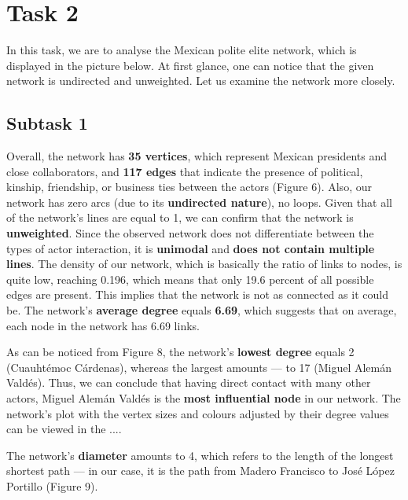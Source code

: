 \section{Task 2}
In this task, we are to analyse the Mexican polite elite network, which is displayed in the picture below. At first glance, one can notice that the given network is undirected and unweighted. Let us examine the network more closely.



\subsection{Subtask 1}
Overall, the network has \textbf{35 vertices}, which represent Mexican presidents and close collaborators, and \textbf{117 edges} that indicate the presence of political, kinship, friendship, or business ties between the actors (Figure 6). Also, our network has zero arcs (due to its \textbf{undirected nature}), no loops. Given that all of the network’s lines are equal to 1, we can confirm that the network is \textbf{unweighted}. Since the observed network does not differentiate between the types of actor interaction, it is \textbf{unimodal} and \textbf{does not contain multiple lines}. The density of our network, which is basically the ratio of links to nodes, is quite low, reaching 0.196, which means that only 19.6 percent of all possible edges are present. This implies that the network is not as connected as it could be. The network’s \textbf{average degree} equals \textbf{6.69}, which suggests that on average, each node in the network has 6.69 links.

\FloatBarrier


As can be noticed from Figure 8, the network’s \textbf{lowest degree} equals 2 (Cuauhtémoc Cárdenas), whereas the largest amounts — to 17 (Miguel Alemán Valdés). Thus, we can conclude that having direct contact with many other actors, Miguel Alemán Valdés is the \textbf{most influential node} in our network. The network’s plot with the vertex sizes and colours adjusted by their degree values can be viewed in the ....


The network’s \textbf{diameter} amounts to 4, which refers to the length of the longest shortest path —  in our case, it is the path from Madero Francisco to José López Portillo (Figure 9).

